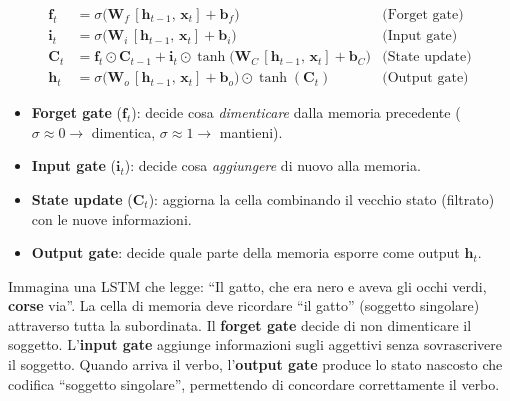 \documentclass[
  11pt,
]{article}
\begin{document}
\begin{formulabox}[title={\textbf{Equazioni della LSTM}}]
\begin{align}
\mathbf{f}_t &= \sigma\!\bigl(\mathbf{W}_f\,[\mathbf{h}_{t-1},\,\mathbf{x}_t] + \mathbf{b}_f\bigr) & \text{(Forget gate)} \\[4pt]
\mathbf{i}_t &= \sigma\!\bigl(\mathbf{W}_i\,[\mathbf{h}_{t-1},\,\mathbf{x}_t] + \mathbf{b}_i\bigr) & \text{(Input gate)} \\[4pt]
\mathbf{C}_t &= \mathbf{f}_t \odot \mathbf{C}_{t-1} + \mathbf{i}_t \odot \tanh\!\bigl(\mathbf{W}_C\,[\mathbf{h}_{t-1},\,\mathbf{x}_t] + \mathbf{b}_C\bigr) & \text{(State update)} \\[4pt]
\mathbf{h}_t &= \sigma\!\bigl(\mathbf{W}_o\,[\mathbf{h}_{t-1},\,\mathbf{x}_t] + \mathbf{b}_o\bigr) \odot \tanh(\mathbf{C}_t) & \text{(Output gate)}
\end{align}
\end{formulabox}

\begin{notabox}[title={\textbf{In parole semplici}}]
\begin{itemize}
\item \textbf{Forget gate} ($\mathbf{f}_t$): decide cosa \emph{dimenticare} dalla memoria precedente ($\sigma \approx 0 \to$ dimentica, $\sigma \approx 1 \to$ mantieni).
\item \textbf{Input gate} ($\mathbf{i}_t$): decide cosa \emph{aggiungere} di nuovo alla memoria.
\item \textbf{State update} ($\mathbf{C}_t$): aggiorna la cella combinando il vecchio stato (filtrato) con le nuove informazioni.
\item \textbf{Output gate}: decide quale parte della memoria esporre come output $\mathbf{h}_t$.
\end{itemize}
\end{notabox}

\begin{notabox}[title={\textbf{In parole semplici: LSTM che legge un testo}}]
Immagina una LSTM che legge: ``Il gatto, che era nero e aveva gli occhi verdi, \textbf{corse} via''. La cella di memoria deve ricordare ``il gatto'' (soggetto singolare) attraverso tutta la subordinata. Il \textbf{forget gate} decide di non dimenticare il soggetto. L'\textbf{input gate} aggiunge informazioni sugli aggettivi senza sovrascrivere il soggetto. Quando arriva il verbo, l'\textbf{output gate} produce lo stato nascosto che codifica ``soggetto singolare'', permettendo di concordare correttamente il verbo.
\end{notabox}
\end{document}
